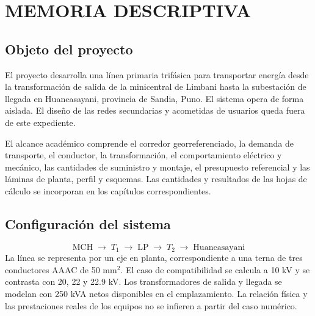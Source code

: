 \chapter{MEMORIA DESCRIPTIVA}
\section{Objeto del proyecto}
El proyecto desarrolla una línea primaria trifásica para transportar energía desde la transformación de salida de la minicentral de Limbani hasta la subestación de llegada en Huancasayani, provincia de Sandia, Puno. El sistema opera de forma aislada. El diseño de las redes secundarias y acometidas de usuarios queda fuera de este expediente.

El alcance académico comprende el corredor georreferenciado, la demanda de transporte, el conductor, la transformación, el comportamiento eléctrico y mecánico, las cantidades de suministro y montaje, el presupuesto referencial y las láminas de planta, perfil y esquemas. Las cantidades y resultados de las hojas de cálculo se incorporan en los capítulos correspondientes.

\section{Configuración del sistema}
\begin{equation}
\text{MCH}\;\longrightarrow\;T_1\;\longrightarrow\;\text{LP}\;\longrightarrow\;T_2\;\longrightarrow\;\text{Huancasayani}
\end{equation}
La línea se representa por un eje en planta, correspondiente a una terna de tres conductores AAAC de 50 mm$^2$. El caso de compatibilidad se calcula a 10 kV y se contrasta con 20, 22 y 22.9 kV. Los transformadores de salida y llegada se modelan con 250 kVA netos disponibles en el emplazamiento. La relación física y las prestaciones reales de los equipos no se infieren a partir del caso numérico.

